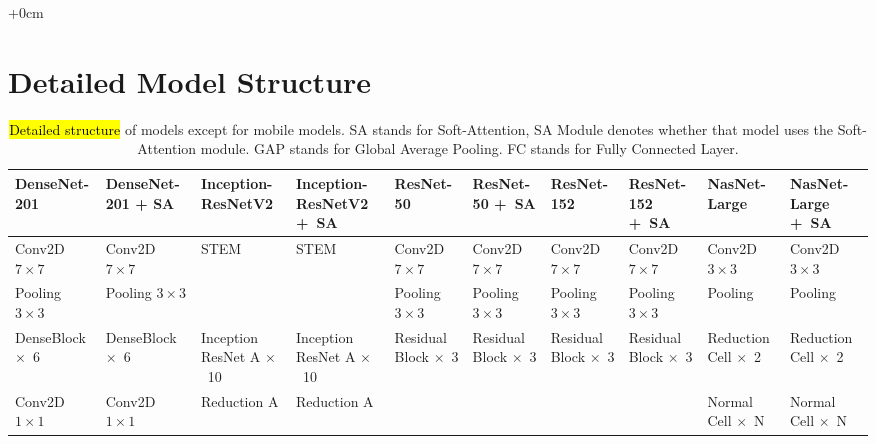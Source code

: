 \documentclass[sensors,article,accept,pdftex,moreauthors]{Definitions/mdpi}
\begin{document}
	
	\appendixstart
	\appendix
\startlandscape

\begin{adjustwidth}{+\extralength}{0cm}
	\section[\appendixname~\thesection]{Detailed Model Structure}
	
	\begin{table}[H]
			\caption{\hl{Detailed structure} %
 of models except for mobile models. SA stands for Soft-Attention, SA Module denotes whether that model uses the Soft-Attention module. GAP stands for Global Average Pooling. FC stands for Fully Connected Layer.\label{appendix-table:detailed structure model}}
\begin{tabularx}{\textwidth}{p{2.2cm}  p{2.2cm}  p{2.2cm}  p{2.6cm}  p{2.2cm}  p{2.2cm}  p{2.2cm}  p{2.2cm}  p{2.4cm}  p{2.6cm}}
	\toprule
	\textbf{DenseNet-201} & \textbf{DenseNet-201 + SA} & \textbf{Inception-ResNetV2} & \textbf{Inception-ResNetV2 +~SA} & \textbf{ResNet-50} & \textbf{ResNet-50 +~SA} & \textbf{ResNet-152} & \textbf{ResNet-152 +~SA} & \textbf{NasNet-Large} & \textbf{NasNet-Large +~SA}\\
	\midrule
	Conv2D $7 \times 7$ & Conv2D $7 \times 7$ & STEM& STEM& Conv2D $7 \times 7$& Conv2D $7 \times 7$& Conv2D $7 \times 7$& Conv2D $7 \times 7$& Conv2D $3 \times 3$& Conv2D $3 \times 3$\\ \midrule
	Pooling $3 \times 3$ & Pooling $3 \times 3$ & & & Pooling $3 \times 3$& Pooling  $3 \times 3$& Pooling  $3 \times 3$& Pooling  $3 \times 3$& Pooling& Pooling\\ \midrule		
	DenseBlock $\times$~6 & DenseBlock $\times$~6 & Inception ResNet A $\times$~10& Inception ResNet A $\times$~10& Residual Block $\times$~3& Residual Block $\times$~3& Residual Block $\times$~3& Residual Block $\times$~3& Reduction Cell $\times$~2& Reduction Cell $\times$~2\\  \midrule
	Conv2D $1 \times 1$ & Conv2D $1 \times 1$ & Reduction A & Reduction A & & & & & Normal Cell $\times$~N& Normal Cell $\times$~N\\	\midrule

\end{tabularx}
\end{table}
\end{adjustwidth}
\end{document}
